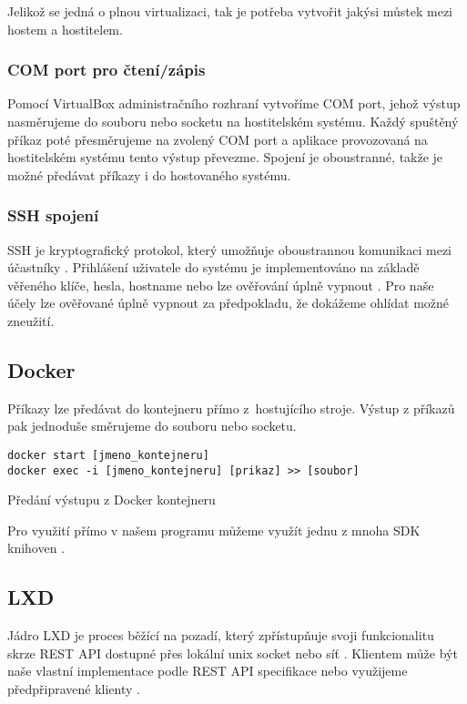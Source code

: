 Jelikož se jedná o plnou virtualizaci, tak je potřeba vytvořit jakýsi můstek mezi hostem a hostitelem.

\subsubsection{COM port pro čtení/zápis}

Pomocí VirtualBox administračního rozhraní vytvoříme COM port, jehož výstup nasměrujeme do souboru nebo socketu na hostitelském systému.
Každý spuštěný příkaz poté přesměrujeme na zvolený COM port a aplikace provozovaná na hostitelském systému tento výstup převezme.
Spojení je oboustranné, takže je možné předávat příkazy i do hostovaného systému.
\cite{virtualbox_serial}

\subsubsection{SSH spojení}

SSH je kryptografický protokol, který umožňuje oboustrannou komunikaci mezi účastníky \cite{ssh_rfc}.
Přihlášení uživatele do systému je implementováno na základě věřeného klíče, hesla, hostname nebo lze ověřování úplně vypnout \cite{ssh_auth_rfc}.
Pro naše účely lze ověřované úplně vypnout za předpokladu, že dokážeme ohlídat možné zneužití.

\subsection{Docker}

Příkazy lze předávat do kontejneru přímo z~hostujícího stroje.
Výstup z příkazů pak jednoduše směrujeme do souboru nebo socketu.

\begin{listing}[ht]
\begin{verbatim}
docker start [jmeno_kontejneru]
docker exec -i [jmeno_kontejneru] [prikaz] >> [soubor]
\end{verbatim}
\caption{Předání výstupu z Docker kontejneru}
\end{listing}

Pro využití přímo v našem programu můžeme využít jednu z mnoha SDK knihoven \cite{docker_sdk}.

\subsection{LXD}

Jádro LXD je proces běžící na pozadí, který zpřístupňuje svoji funkcionalitu skrze REST API dostupné přes lokální unix socket nebo síť \cite{lxd}.
Klientem může být naše vlastní implementace podle REST API specifikace nebo využijeme předpřipravené klienty \cite{lxd_rest}.

